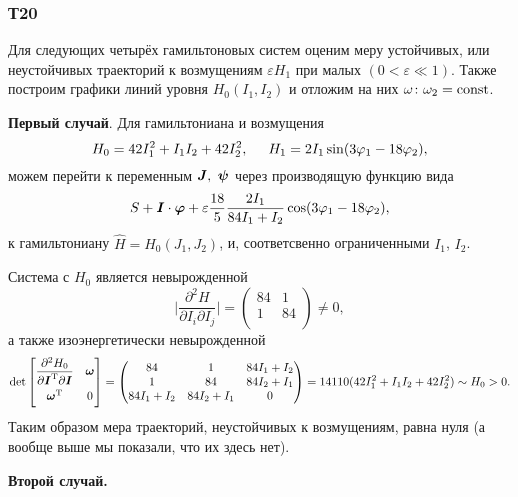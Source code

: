\subsubsection*{Т20}


Для следующих четырёх гамильтоновых систем оценим меру устойчивых, или неустойчивых траекторий к возмущениям $\varepsilon H_1$ при малых $(0 < \varepsilon \ll 1)$. Также построим графики линий уровня $H_0 (I_1, I_2)$ и отложим на них $\omega \colon  \omega_2 = \text{const}$. 


\textbf{Первый случай}. Для гамильтониана и возмущения
\begin{equation*}
    H_0 = 42 I_1^2 + I_1 I_2 + 42 I_2^2, \hspace{5 mm} H_1 = 2 I_1 \sin(3 \varphi_1 - 18 \varphi_2),
\end{equation*}
можем перейти к переменным $\mbox{\boldmath $J$}, \ \mbox{\boldmath $\psi$}$ через производящую функцию вида
\begin{equation*}
    S + \mbox{\boldmath $I$} \cdot \mbox{\boldmath $\varphi$} + \varepsilon \frac{18}{5} \frac{2I_1}{84 I_1 + I_2} \cos(3 \varphi_1 - 18 \varphi_2),
\end{equation*}
к гамильтониану $\hat{H} = H_0(J_1, J_2)$, и, соответсвенно ограниченными $I_1$, $I_2$. 

Система с $H_0$ является невырожденной 
\begin{equation*}
    \bigg| \frac{\partial^2 H}{\partial I_i \partial I_j} \bigg| = 
    \begin{pmatrix}
        84 & 1  \\
        1 & 84  \\
    \end{pmatrix} \neq 0,
\end{equation*}
а также изоэнергетически невырожденной
\begin{equation*}
     \det \begin{bmatrix}
        \vphantom{\dfrac{1}{2}}
            \dfrac{\partial^2 H_0}{\partial \vc{I}\T \partial \vc{I}} & \vc{\omega} \\
        \vphantom{\dfrac{1}{2}}
            \vc{\omega}\T & 0
        \end{bmatrix} = \begin{pmatrix}
            84 & 1 & 84 I_1 + I_2 \\
            1 & 84 & 84 I_2 + I_1 \\
            84 I_1 + I_2 & 84 I_2 + I_1 & 0 \\
        \end{pmatrix} = 14110 (42 I_1^2 + I_1 I_2 + 42 I_2^2) \sim H_0 > 0.
\end{equation*}
Таким образом мера траекторий, неустойчивых к возмущениям, равна нуля (а вообще выше мы показали, что их здесь нет).


\textbf{Второй случай.}